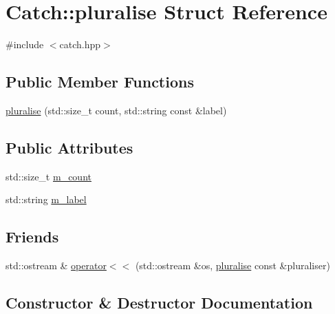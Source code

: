 \hypertarget{struct_catch_1_1pluralise}{}\section{Catch\+::pluralise Struct Reference}
\label{struct_catch_1_1pluralise}


{\ttfamily \#include $<$catch.\+hpp$>$}

\subsection*{Public Member Functions}
\begin{DoxyCompactItemize}
\item 
\mbox{\hyperlink{struct_catch_1_1pluralise_a5c55e22de2416cfe416edf715c6b9234}{pluralise}} (std\+::size\+\_\+t count, std\+::string const \&label)
\end{DoxyCompactItemize}
\subsection*{Public Attributes}
\begin{DoxyCompactItemize}
\item 
std\+::size\+\_\+t \mbox{\hyperlink{struct_catch_1_1pluralise_a4dce2fa13ec6f00fac09b2418265441e}{m\+\_\+count}}
\item 
std\+::string \mbox{\hyperlink{struct_catch_1_1pluralise_a8849cbdd3f11ebe7747597c8644e8793}{m\+\_\+label}}
\end{DoxyCompactItemize}
\subsection*{Friends}
\begin{DoxyCompactItemize}
\item 
std\+::ostream \& \mbox{\hyperlink{struct_catch_1_1pluralise_aa7dac6b165514c1f85e0695d678fdef5}{operator$<$$<$}} (std\+::ostream \&os, \mbox{\hyperlink{struct_catch_1_1pluralise}{pluralise}} const \&pluraliser)
\end{DoxyCompactItemize}


\subsection{Constructor \& Destructor Documentation}
\mbox{\label{struct_catch_1_1pluralise_a5c55e22de2416cfe416edf715c6b9234}} 

